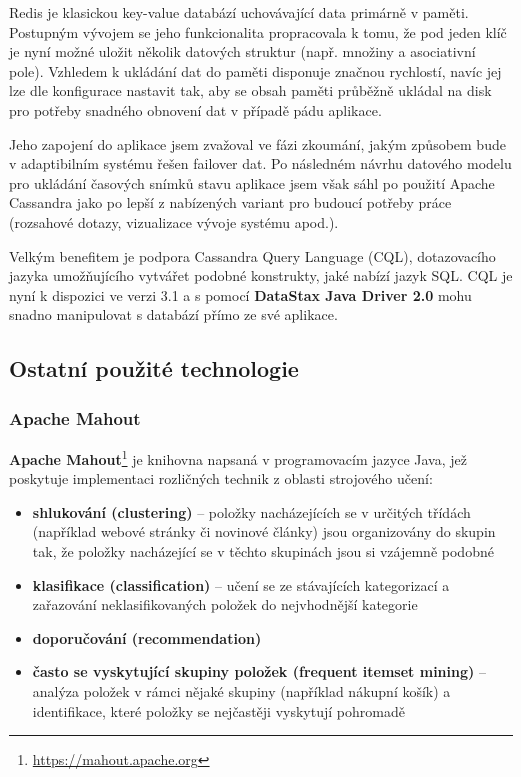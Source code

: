 \documentclass[thesis=M,czech]{FITthesis}[2014/05/07]
\begin{document}
Redis je klasickou key-value databází uchovávající data primárně v paměti. Postupným vývojem se jeho funkcionalita propracovala k tomu, že pod jeden klíč je nyní možné uložit několik datových struktur (např. množiny a asociativní pole). Vzhledem k ukládání dat do paměti disponuje značnou rychlostí, navíc jej lze dle konfigurace nastavit tak, aby se obsah paměti průběžně ukládal na disk pro potřeby snadného obnovení dat v případě pádu aplikace.

Jeho zapojení do aplikace jsem zvažoval ve fázi zkoumání, jakým způsobem bude v adaptibilním systému řešen failover dat. Po následném návrhu datového modelu pro ukládání časových snímků stavu aplikace jsem však sáhl po použití Apache Cassandra jako po lepší z nabízených variant pro budoucí potřeby práce (rozsahové dotazy, vizualizace vývoje systému apod.). 

Velkým benefitem je podpora Cassandra Query Language (CQL), dotazovacího jazyka umožňujícího vytvářet podobné konstrukty, jaké nabízí jazyk SQL. CQL je nyní k dispozici ve verzi 3.1 a s pomocí \textbf{DataStax Java Driver 2.0} mohu snadno manipulovat s databází přímo ze své aplikace. 

\subsection{Ostatní použité technologie}

\subsubsection{Apache Mahout}
\label{mahout}
\textbf{Apache Mahout}\footnote{\url{https://mahout.apache.org}} je knihovna napsaná v programovacím jazyce Java, jež poskytuje implementaci rozličných technik z oblasti strojového učení:

\begin{itemize}
	\item \textbf{shlukování (clustering)} – položky nacházejících se v určitých třídách (například webové stránky či novinové články) jsou organizovány do skupin tak, že položky nacházející se v těchto skupinách jsou si vzájemně podobné
	\item \textbf{klasifikace (classification)} – učení se ze stávajících kategorizací a zařazování neklasifikovaných položek do nejvhodnější kategorie
	\item \textbf{doporučování (recommendation)}
	\item \textbf{často se vyskytující skupiny položek (frequent itemset mining)} – analýza položek v rámci nějaké skupiny (například nákupní košík) a identifikace, které položky se nejčastěji vyskytují pohromadě
\end{itemize}
\end{document}
